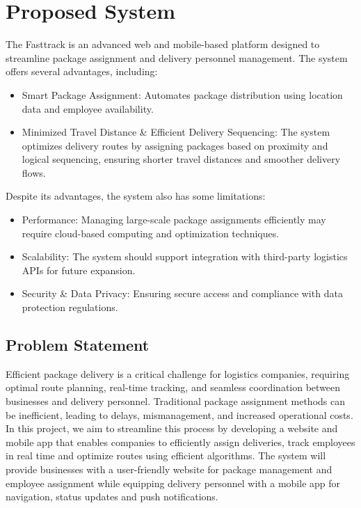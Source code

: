 \section{Proposed System}
The Fasttrack is an advanced web and mobile-based platform designed to streamline package assignment and delivery personnel management. The system offers several advantages, including:
\begin{itemize}
    \item Smart Package Assignment: Automates package distribution using location data and employee availability.
    \item Minimized Travel Distance \& Efficient Delivery Sequencing: The system optimizes delivery routes by assigning packages based on proximity and logical sequencing, ensuring shorter travel distances and smoother delivery flows.
\end{itemize}
Despite its advantages, the system also has some limitations:
\begin{itemize}
    \item Performance: Managing large-scale package assignments efficiently may require cloud-based computing and optimization techniques.
    \item Scalability: The system should support integration with third-party logistics APIs for future expansion.
    \item Security \& Data Privacy: Ensuring secure access and compliance with data protection regulations.
\end{itemize}
\subsection{Problem Statement}
Efficient package delivery is a critical challenge for logistics companies, requiring optimal route planning, real-time tracking, and seamless coordination between businesses and delivery personnel. Traditional package assignment methods can be inefficient, leading to delays, mismanagement, and increased operational costs. In this project, we aim to streamline this process by developing a website and mobile app that enables companies to efficiently assign deliveries, track employees in real time and optimize routes using efficient algorithms. The system will provide businesses with a user-friendly website for package management and employee assignment while equipping delivery personnel with a mobile app for navigation, status updates and push notifications.
